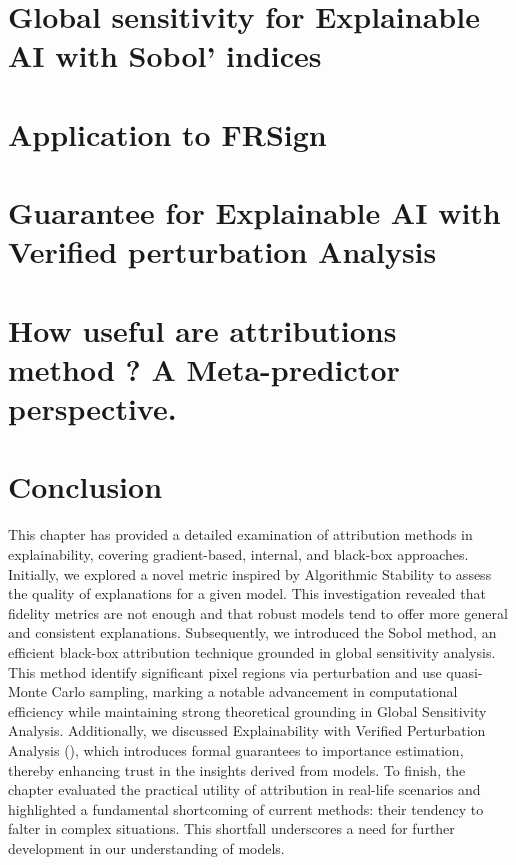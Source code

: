 \section{Global sensitivity for Explainable AI with Sobol' indices}
\label{sec:attributions:sobol}

\clearpage

\section{Application to FRSign}
\label{sec:attribution:frsign}

\clearpage

\section{Guarantee for Explainable AI with Verified perturbation Analysis}
\label{sec:attributions:eva}

\clearpage

\section{How useful are attributions method ? A Meta-predictor perspective.}
\label{sec:attributions:metapred}

\clearpage

\section{Conclusion}

This chapter has provided a detailed examination of attribution methods in explainability, covering gradient-based, internal, and black-box approaches. 
Initially, we explored a novel metric inspired by Algorithmic Stability to assess the quality of explanations for a given model. This investigation revealed that fidelity metrics are not enough and that robust models tend to offer more general and consistent explanations.
Subsequently, we introduced the Sobol method, an efficient black-box attribution technique grounded in global sensitivity analysis. This method identify significant pixel regions via perturbation and use quasi-Monte Carlo sampling, marking a notable advancement in computational efficiency while maintaining strong theoretical grounding in Global Sensitivity Analysis.
Additionally, we discussed Explainability with Verified Perturbation Analysis (\eva), which introduces formal guarantees to importance estimation, thereby enhancing trust in the insights derived from models.
To finish, the chapter evaluated the practical utility of attribution in real-life scenarios and highlighted a fundamental shortcoming of current methods: their tendency to falter in complex situations. This shortfall underscores a need for further development in our understanding of models.

